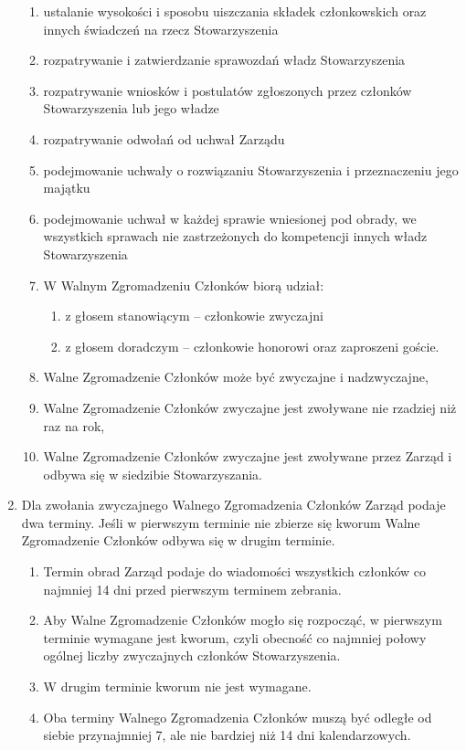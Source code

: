 \documentclass{article}
\begin{document}
\begin{enumerate}
\begin{enumerate}
        \item ustalanie wysokości i sposobu uiszczania składek członkowskich oraz innych świadczeń na rzecz Stowarzyszenia
        \item rozpatrywanie i zatwierdzanie sprawozdań władz Stowarzyszenia
        \item rozpatrywanie wniosków i postulatów zgłoszonych przez członków Stowarzyszenia lub jego władze
        \item rozpatrywanie odwołań od uchwał Zarządu
        \item podejmowanie uchwały o rozwiązaniu Stowarzyszenia i przeznaczeniu jego majątku
        \item podejmowanie uchwał w każdej sprawie wniesionej pod obrady, we wszystkich sprawach nie zastrzeżonych do kompetencji innych władz Stowarzyszenia
        \item W Walnym Zgromadzeniu Członków biorą udział:
          \begin{enumerate}
            \item z głosem stanowiącym – członkowie zwyczajni
            \item z głosem doradczym – członkowie honorowi oraz zaproszeni goście.
          \end{enumerate}
        \item Walne Zgromadzenie Członków może być zwyczajne i nadzwyczajne,
        \item Walne Zgromadzenie Członków zwyczajne jest zwoływane nie rzadziej niż raz na rok,
        \item Walne Zgromadzenie Członków zwyczajne jest zwoływane przez Zarząd i odbywa się w siedzibie Stowarzyszania.
      \end{enumerate}
    \item Dla zwołania zwyczajnego Walnego Zgromadzenia Członków Zarząd podaje dwa terminy. Jeśli w pierwszym terminie nie zbierze się kworum Walne Zgromadzenie Członków odbywa się w drugim terminie.
      \begin{enumerate}
        \item Termin obrad Zarząd podaje do wiadomości wszystkich członków co najmniej 14 dni przed pierwszym terminem zebrania.
        \item Aby Walne Zgromadzenie Członków mogło się rozpocząć, w pierwszym terminie wymagane jest kworum, czyli obecność co najmniej połowy ogólnej liczby zwyczajnych członków Stowarzyszenia.
        \item W drugim terminie kworum nie jest wymagane.
        \item Oba terminy Walnego Zgromadzenia Członków muszą być odległe od siebie przynajmniej 7, ale nie bardziej niż 14 dni kalendarzowych.

\end{enumerate}
\end{enumerate}
\end{document}

